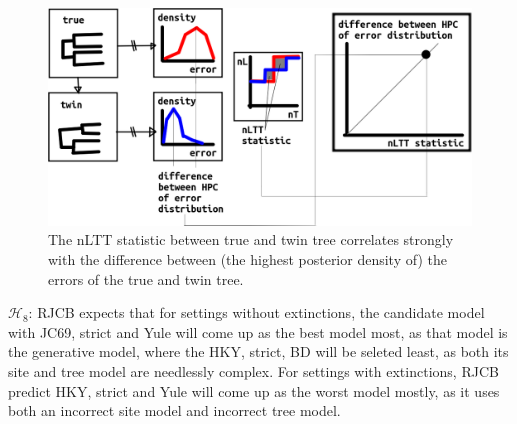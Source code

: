 \begin{figure}[!htbp]
  \includegraphics[width=\textwidth]{20191126_nltt_as_proxy.png}
  \caption{
    The nLTT statistic between true and twin tree correlates strongly
    with the difference between (the highest posterior density
    of) the errors of the true and twin tree.
  }
  \label{fig:nltt_as_proxy}
\end{figure}

$\mathcal{H}_8$: RJCB expects that for settings without extinctions,
the candidate model with JC69, strict and Yule will come up as the best
model most, as that model is the generative model, where the HKY, strict, BD
will be seleted least, as both its site and tree model are needlessly complex.
For settings with extinctions, RJCB predict HKY, strict and Yule will come up 
as the worst model mostly, as it uses both an incorrect site model and incorrect
tree model. 

